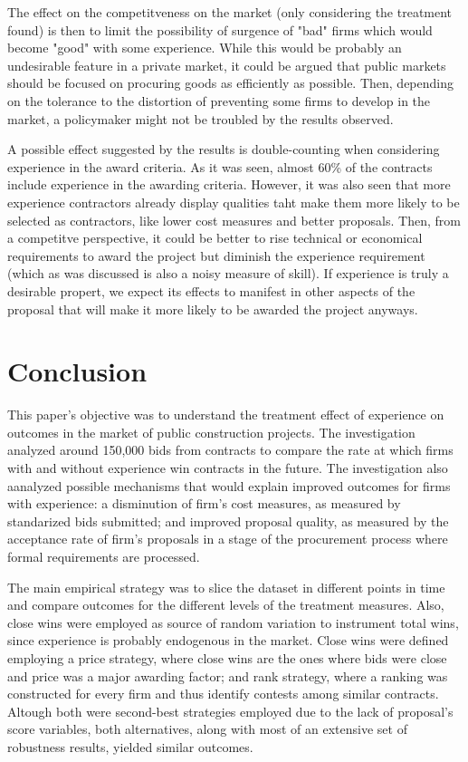 The effect on the competitveness on the market (only considering the treatment found) is then to limit the possibility of surgence of "bad" firms which would become "good" with some experience. While this would be probably an undesirable feature in a private market, it could be argued that public markets should be focused on procuring goods as efficiently as possible. Then, depending on the tolerance to the distortion of preventing some firms to develop in the market, a policymaker might not be troubled by the results observed.

A possible effect suggested by the results is double-counting when considering experience in the award criteria. As it was seen, almost 60\% of the contracts include experience in the awarding criteria. However, it was also seen that more experience contractors already display qualities taht make them more likely to be selected as contractors, like lower cost measures and better proposals. Then, from a competitve perspective, it could be better to rise technical or economical requirements to award the project but diminish the experience requirement (which as was discussed is also a noisy measure of skill). If experience is truly a desirable propert, we expect its effects to manifest in other aspects of the proposal that will make it more likely to be awarded the project anyways.


\chapter{Conclusion}
This paper's objective was to understand the treatment effect of experience on outcomes in the market of public construction projects. The investigation analyzed around 150,000 bids from contracts to compare the rate at which firms with and without experience win contracts in the future. The investigation also aanalyzed possible mechanisms that would explain improved outcomes for firms with experience: a disminution of firm's cost measures, as measured by standarized bids submitted; and improved proposal quality, as measured by the acceptance rate of firm's proposals in a stage of the procurement process where formal requirements are processed.

The main empirical strategy was to slice the dataset in different points in time and compare outcomes for the different levels of the treatment measures. Also, close wins were employed as source of random variation to instrument total wins, since experience is probably endogenous in the market. Close wins were defined employing a price strategy, where close wins are the ones where bids were close and price was a major awarding factor; and rank strategy, where a ranking was constructed for every firm and thus identify contests among similar contracts. Altough both were second-best strategies employed due to the lack of proposal's score variables, both alternatives, along with most of an extensive set of robustness results, yielded similar outcomes.


